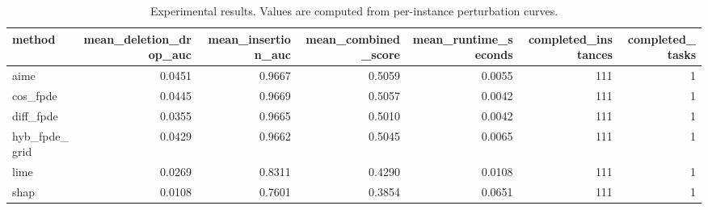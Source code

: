 \begin{table}[t]
\caption{Experimental results. Values are computed from per-instance perturbation curves.}
\label{tab:main_results_computed}
\centering
\begin{tabular}{lrrrrrr}
\toprule
method & mean\_deletion\_drop\_auc & mean\_insertion\_auc & mean\_combined\_score & mean\_runtime\_seconds & completed\_instances & completed\_tasks \\
\midrule
aime & 0.0451 & 0.9667 & 0.5059 & 0.0055 & 111 & 1 \\
cos\_fpde & 0.0445 & 0.9669 & 0.5057 & 0.0042 & 111 & 1 \\
diff\_fpde & 0.0355 & 0.9665 & 0.5010 & 0.0042 & 111 & 1 \\
hyb\_fpde\_grid & 0.0429 & 0.9662 & 0.5045 & 0.0065 & 111 & 1 \\
lime & 0.0269 & 0.8311 & 0.4290 & 0.0108 & 111 & 1 \\
shap & 0.0108 & 0.7601 & 0.3854 & 0.0651 & 111 & 1 \\
\bottomrule
\end{tabular}

\end{table}
